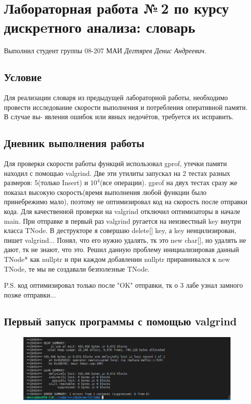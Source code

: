 \documentclass[12pt]{article}
\begin{document}
\section*{Лабораторная работа №\,2 по курсу дискрeтного анализа: словарь}

Выполнил студент группы 08-207 МАИ \textit{Дегтярев Денис Андреевич}.

\subsection*{Условие}

Для реализации словаря из предыдущей лабораторной работы, необходимо провести
исследование скорости выполнения и потребления оперативной памяти. В случае вы-
явления ошибок или явных недочётов, требуется их исправить.

\subsection*{Дневник выполнения работы}

Для проверки скорости работы функций использовал gprof, утечки памяти находил с помощью valgrind. 
Две эти утилиты запускал на 2 тестах разных размеров: 5(только Insert) и $10^4$(все операции). 
gprof на двух тестах сразу же показал высокую скорость(время выполнения любой функции было 
принебрежимо мало), поэтому не оптимизировал код на скорость после отправки кода. Для качественной
проверки на valgrind отключил оптимизаторы в начале main. При отправке в первый раз
valgrind ругается на неизвестный key внутри класса TNode. В деструкторе я совершаю delete[] key, 
а key неицилизирован, пишет valgrind... Понял, что его нужно удалять, тк это new char[], но удалять
не дают, тк не знают, что это. Решил данную проблему инициализировав данный TNode* как nullptr 
и при каждом добавлении nullptr приравнивался к new TNode, те мы не создавали безполезные TNode.  

P.S. код оптимизировал только после "OK" отправки, тк о 3 лабе узнал замного позже отправки...

\subsection*{Первый запуск программы с помощью valgrind}

\begin{figure}[ht!]
    \includegraphics[width=.99\textwidth]{v3.png}
\end{figure}
\end{document}
